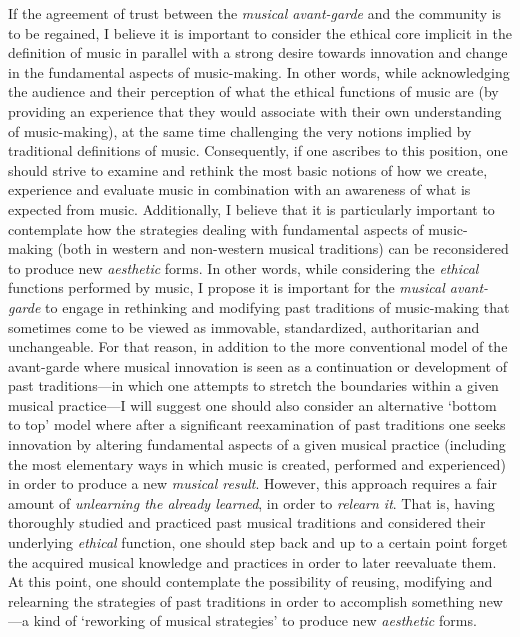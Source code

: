 If the agreement of trust between the \emph{musical avant-garde} and the community is to be regained, I believe it is important to consider the ethical core implicit in the definition of music in parallel with a strong desire towards innovation and change in the fundamental aspects of music-making. In other words, while acknowledging the audience and their perception of what the ethical functions of music are (by providing an experience that they would associate with their own understanding of music-making), at the same time challenging the very notions implied by traditional definitions of music. Consequently, if one ascribes to this position, one should strive to examine and rethink the most basic notions of how we create, experience and evaluate music in combination with an awareness of what is expected from music. Additionally, I believe that it is particularly important to contemplate how the strategies dealing with fundamental aspects of music-making (both in western and non-western musical traditions) can be reconsidered to produce new \emph{aesthetic} forms. In other words, while considering the \emph{ethical} functions performed by music, I propose it is important for the \emph{musical avant-garde} to engage in rethinking and modifying past traditions of music-making that sometimes come to be viewed as immovable, standardized, authoritarian and unchangeable. For that reason, in addition to the more conventional model of the avant-garde where musical innovation is seen as a continuation or development of past traditions---in which one attempts to stretch the boundaries within a given musical practice---I will suggest one should also consider an alternative `bottom to top' model where after a significant reexamination of past traditions one seeks innovation by altering fundamental aspects of a given musical practice (including the most elementary ways in which music is created, performed and experienced) in order to produce a new \emph{musical result}. However, this approach requires a fair amount of \emph{unlearning the already learned}, in order to \emph{relearn it}. That is, having thoroughly studied and practiced past musical traditions and considered their underlying \emph{ethical} function, one should step back and up to a certain point forget the acquired musical knowledge and practices in order to later reevaluate them. At this point, one should contemplate the possibility of reusing, modifying and relearning the strategies of past traditions in order to accomplish something new---a kind of `reworking of musical strategies' to produce new \emph{aesthetic} forms. 


